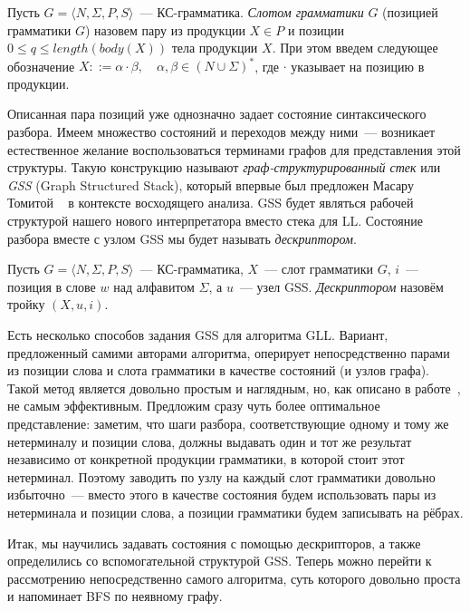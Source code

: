 \begin{definition}
  Пусть $G = \langle N, \Sigma, P, S \rangle$~--- КС-грамматика. \textit{Слотом грамматики} $G$ (позицией грамматики $G$) назовем пару из продукции $X \in P$ и позиции $0 \leq q \leq length(body(X))$ тела продукции $X$. При этом введем следующее обозначение $X ::= \alpha \cdot \beta, \quad \alpha,\beta \in (N \cup \Sigma)^*$, где $ \cdot $ указывает на позицию в продукции.
\end{definition}

Описанная пара позиций уже однозначно задает состояние синтаксического разбора. Имеем множество состояний и переходов между ними~--- возникает естественное желание воспользоваться терминами графов для представления этой структуры. Такую конструкцию называют \textit{граф-структурированный стек} или \textit{GSS} (Graph Structured Stack), который впервые был предложен Масару Томитой ~\cite{tomita1988graph} в контексте восходящего анализа. GSS будет являться рабочей структурой нашего нового интерпретатора вместо стека для LL. Состояние разбора вместе с узлом GSS мы будет называть \textit{дескриптором}.

\begin{definition}
  Пусть $G = \langle N, \Sigma, P, S \rangle$~--- КС-грамматика, $X$~--- слот грамматики $G$, $i$~--- позиция в слове $ w $ над алфавитом $\Sigma$, а $ u $~--- узел GSS. \textit{Дескриптором} назовём тройку $ (X, u, i) $.
\end{definition}

Есть несколько способов задания GSS для алгоритма GLL. Вариант, предложенный самими авторами алгоритма, оперирует непосредственно парами из позиции слова и слота грамматики в качестве состояний (и узлов графа). Такой метод является довольно простым и наглядным, но, как описано в работе~\cite{10.1007/978-3-662-46663-6_5}, не самым эффективным. Предложим сразу чуть более оптимальное представление: заметим, что шаги разбора, соответствующие одному и тому же нетерминалу и позиции слова, должны выдавать один и тот же результат независимо от конкретной продукции грамматики, в которой стоит этот нетерминал. Поэтому заводить по узлу на каждый слот грамматики довольно избыточно~--- вместо этого в качестве состояния будем использовать пары из нетерминала и позиции слова, а позиции грамматики будем записывать на рёбрах.

Итак, мы научились задавать состояния с помощью дескрипторов, а также определились со вспомогательной структурой GSS. Теперь можно перейти к рассмотрению непосредственно самого алгоритма, суть которого довольно проста и напоминает BFS по неявному графу.

